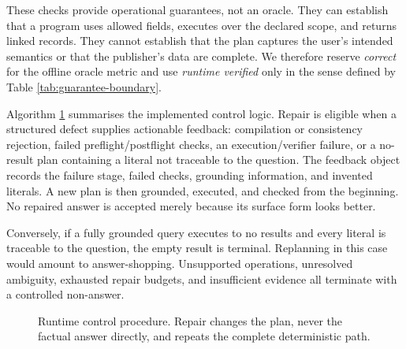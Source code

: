 These checks provide operational guarantees, not an oracle.  They can establish that a program
uses allowed fields, executes over the declared scope, and returns linked records.  They cannot
establish that the plan captures the user's intended semantics or that the publisher's data are
complete.  We therefore reserve \emph{correct} for the offline oracle metric and use
\emph{runtime verified} only in the sense defined by Table \ref{tab:guarantee-boundary}.

\label{sec:repair}
Algorithm \ref{alg:runtime} summarises the implemented control logic.  Repair is eligible when a
structured defect supplies actionable feedback: compilation or consistency rejection, failed
preflight/postflight checks, an execution/verifier failure, or a no-result plan containing a
literal not traceable to the question.  The feedback object records the failure stage, failed
checks, grounding information, and invented literals.  A new plan is then grounded, executed,
and checked from the beginning.  No repaired answer is accepted merely because its surface form
looks better.

Conversely, if a fully grounded query executes to no results and every literal is traceable to
the question, the empty result is terminal.  Replanning in this case would amount to
answer-shopping.  Unsupported operations, unresolved ambiguity, exhausted repair budgets, and
insufficient evidence all terminate with a controlled non-answer.

\begin{figure}[t]
  \centering
  \caption{Runtime control procedure.  Repair changes the plan, never the factual answer
  directly, and repeats the complete deterministic path.}
  \label{alg:runtime}
\end{figure}
